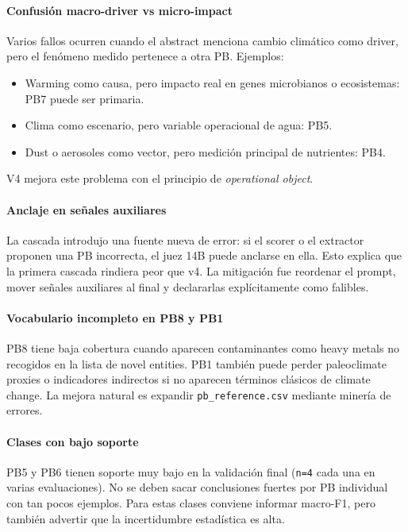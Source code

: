 \paragraph*{Confusión macro-driver vs micro-impact}

Varios fallos ocurren cuando el abstract menciona cambio climático como driver, pero el fenómeno medido pertenece a otra PB. Ejemplos:

\begin{itemize}
\item Warming como causa, pero impacto real en genes microbianos o ecosistemas: PB7 puede ser primaria.
\item Clima como escenario, pero variable operacional de agua: PB5.
\item Dust o aerosoles como vector, pero medición principal de nutrientes: PB4.
\end{itemize}

V4 mejora este problema con el principio de \emph{operational object}.

\paragraph*{Anclaje en señales auxiliares}

La cascada introdujo una fuente nueva de error: si el scorer o el extractor proponen una PB incorrecta, el juez 14B puede anclarse en ella. Esto explica que la primera cascada rindiera peor que v4. La mitigación fue reordenar el prompt, mover señales auxiliares al final y declararlas explícitamente como falibles.

\paragraph*{Vocabulario incompleto en PB8 y PB1}

PB8 tiene baja cobertura cuando aparecen contaminantes como heavy metals no recogidos en la lista de novel entities. PB1 también puede perder paleoclimate proxies o indicadores indirectos si no aparecen términos clásicos de climate change. La mejora natural es expandir \texttt{pb\_reference.csv} mediante minería de errores.

\paragraph*{Clases con bajo soporte}

PB5 y PB6 tienen soporte muy bajo en la validación final (\texttt{n=4} cada una en varias evaluaciones). No se deben sacar conclusiones fuertes por PB individual con tan pocos ejemplos. Para estas clases conviene informar macro-F1, pero también advertir que la incertidumbre estadística es alta.

